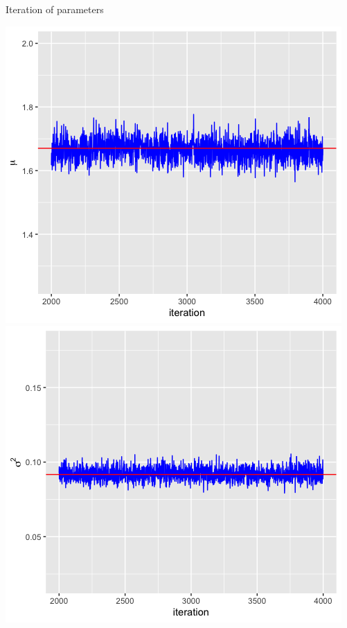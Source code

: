 \documentclass[10 pt]{beamer}
\begin{document}
\begin{frame}{Iteration of parameters}
\centerline{
\includegraphics[scale=0.35]{pic/sp_mu_6.png}
\includegraphics[scale=0.35]{pic/sp_sgm_sq_6.png}}
\end{frame}
\end{document}
